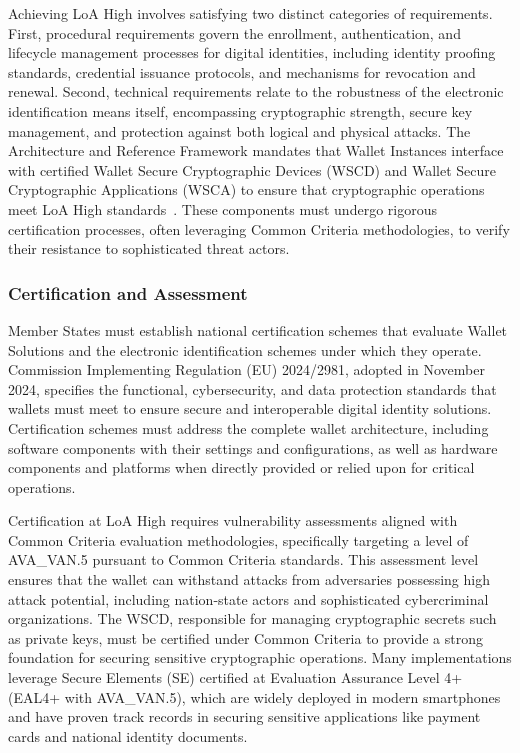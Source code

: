 \documentclass[sigconf,balance,nonacm,authordraft]{acmart}
\begin{document}
Achieving LoA High involves satisfying two distinct categories of requirements. First, procedural requirements govern the enrollment, authentication, and lifecycle management processes for digital identities, including identity proofing standards, credential issuance protocols, and mechanisms for revocation and renewal. Second, technical requirements relate to the robustness of the electronic identification means itself, encompassing cryptographic strength, secure key management, and protection against both logical and physical attacks. The Architecture and Reference Framework mandates that Wallet Instances interface with certified Wallet Secure Cryptographic Devices (WSCD) and Wallet Secure Cryptographic Applications (WSCA) to ensure that cryptographic operations meet LoA High standards~\cite{EU_ARF2024}. These components must undergo rigorous certification processes, often leveraging Common Criteria methodologies, to verify their resistance to sophisticated threat actors.

\subsubsection{Certification and Assessment}

Member States must establish national certification schemes that evaluate Wallet Solutions and the electronic identification schemes under which they operate. Commission Implementing Regulation (EU) 2024/2981, adopted in November 2024, specifies the functional, cybersecurity, and data protection standards that wallets must meet to ensure secure and interoperable digital identity solutions. Certification schemes must address the complete wallet architecture, including software components with their settings and configurations, as well as hardware components and platforms when directly provided or relied upon for critical operations.

Certification at LoA High requires vulnerability assessments aligned with Common Criteria evaluation methodologies, specifically targeting a level of AVA\_VAN.5 pursuant to Common Criteria standards. This assessment level ensures that the wallet can withstand attacks from adversaries possessing high attack potential, including nation-state actors and sophisticated cybercriminal organizations. The WSCD, responsible for managing cryptographic secrets such as private keys, must be certified under Common Criteria to provide a strong foundation for securing sensitive cryptographic operations. Many implementations leverage Secure Elements (SE) certified at Evaluation Assurance Level 4+ (EAL4+ with AVA\_VAN.5), which are widely deployed in modern smartphones and have proven track records in securing sensitive applications like payment cards and national identity documents.
\end{document}
